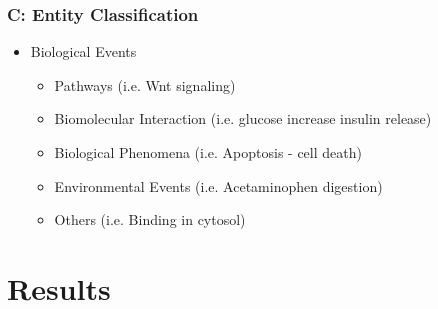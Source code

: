 \documentclass[11pt]{article}
\begin{document}
\begin{itemize}
\begin{itemize}
\begin{itemize}
	\end{itemize}
\end{itemize}	

\subsubsection*{C:  Entity Classification}
\begin{itemize}
\item Biological Events 
	\begin{itemize}
	\item Pathways (i.e. Wnt signaling)
	\item Biomolecular Interaction (i.e. glucose increase insulin release)
	\item Biological Phenomena (i.e. Apoptosis - cell death)
	\item Environmental Events (i.e. Acetaminophen digestion)
	\item Others (i.e. Binding in cytosol)
	\end{itemize}
\end{itemize}


\section{Results}


\end{itemize}
\end{document}
